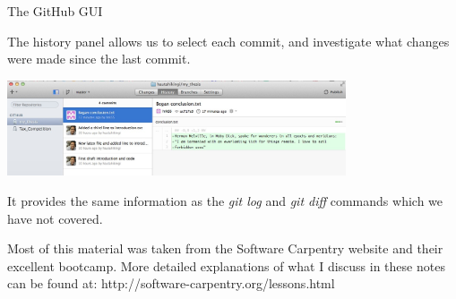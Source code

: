 \documentclass[10pt]{beamer}
\begin{document}
\begin{frame}[fragile]{The GitHub GUI}

The history panel allows us to select each commit, and investigate what changes were made since the last commit.
\begin{center}
\includegraphics[width=10cm]{./auxfiles/GUI_history.jpg}
\end{center}
It provides the same information as the \emph{git log} and \emph{git diff} commands which we have not covered.


\end{frame}
\begin{frame}[fragile]{}

Most of this material was taken from the Software Carpentry website and their excellent bootcamp. More detailed explanations of what I discuss in these notes can be found at: http://software-carpentry.org/lessons.html
\end{frame}

\begin{frame}[plain]{}



\end{frame}

\end{document}

